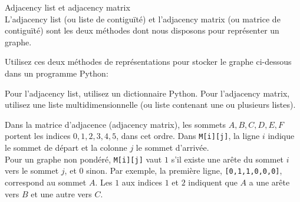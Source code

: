 \begin{Exercice}[10 minutes]  [Python] Adjacency list et adjacency matrix\\
    L'adjacency list (ou liste de contiguïté) et l'adjacency matrix (ou matrice de contiguïté) sont les deux méthodes dont nous disposons pour représenter un graphe. \newline 
    
    Utilisez ces deux méthodes de représentations pour stocker le graphe ci-dessous dans un programme Python\!: \\
    \begin{center}
\end{center}
    \begin{conseil}
    Pour l'adjacency list, utilisez un dictionnaire Python. Pour l'adjacency matrix, utilisez une liste multidimensionnelle (ou liste contenant une ou plusieurs listes).
    \end{conseil}
    \begin{solution}
        
    \end{solution}

    \begin{solution}
    
    Dans la matrice d'adjacence (adjacency matrix), les sommets $A, B, C, D, E, F$ portent les indices $0, 1, 2, 3, 4, 5$, dans cet ordre. Dans \lstinline{M[i][j]}, la ligne $i$ indique le sommet de départ et la colonne $j$ le sommet d'arrivée. \\

    Pour un graphe non pondéré, \lstinline{M[i][j]} vaut $1$ s'il existe une arête du sommet $i$ vers le sommet $j$, et $0$ sinon. Par exemple, la première ligne, \lstinline{[0,1,1,0,0,0]}, correspond au sommet $A$. Les $1$ aux indices $1$ et $2$ indiquent que $A$ a une arête vers $B$ et une autre vers $C$. \\


\end{solution}
\end{Exercice}
